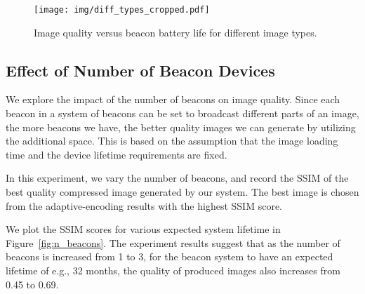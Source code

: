 \begin{figure}[!htb]
		\vspace{-1em}
	\begin{center}
		\texttt{[image: img/diff\_types\_cropped.pdf]}
		\caption{Image quality versus beacon battery life for different image types.}
		\label{fig:diff_types}
	\end{center}
\end{figure}


\subsection{Effect of Number of Beacon Devices}

We explore the impact of the number of beacons on image quality. Since each beacon in a system of beacons can be set to broadcast different parts of an image, the more beacons we have, the better quality images we can generate by utilizing the additional space. This is based on the assumption that the image loading time and the device lifetime requirements are fixed.

In this experiment, we vary the number of beacons, and record the SSIM of the best quality compressed image generated by our system. The best image is chosen from the adaptive-encoding results with the highest SSIM score.

We plot the SSIM scores for various expected system lifetime in Figure~\ref{fig:n_beacons}. The experiment results suggest that as the number of beacons is increased from 1 to 3, for the beacon system to have an expected lifetime of e.g., 32 months, the quality of produced images also increases from 0.45 to 0.69.

